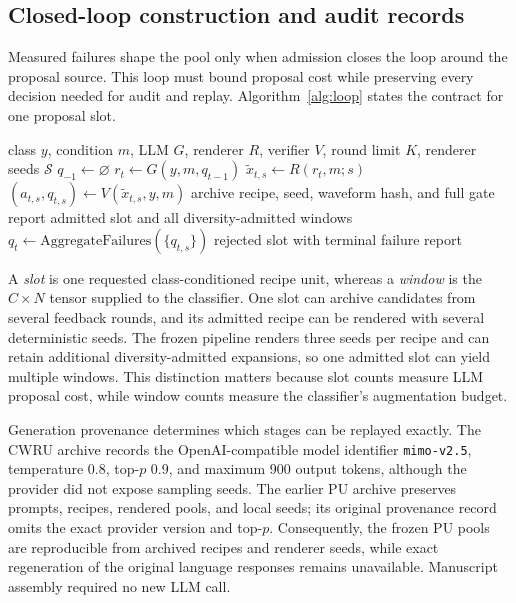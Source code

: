 \documentclass[a4paper,fleqn]{cas-sc}
\newcommand{\breeze}{BREEZE}
\begin{document}
\subsection{Closed-loop construction and audit records}

Measured failures shape the pool only when admission closes the loop around the
proposal source. This loop must bound proposal cost while preserving every
decision needed for audit and replay. Algorithm~\ref{alg:loop} states the
contract for one proposal slot.

\begin{algorithm}[t]
\caption{\breeze\ recipe admission for one proposal slot}
\label{alg:loop}
\begin{algorithmic}[1]
\Require class $y$, condition $m$, LLM $G$, renderer $R$, verifier $V$,
round limit $K$, renderer seeds $\mathcal{S}$
\State $q_{-1}\gets\varnothing$
  \State $r_t\gets G(y,m,q_{t-1})$
    \State $\tilde{x}_{t,s}\gets R(r_t,m;s)$
    \State $(a_{t,s},q_{t,s})\gets V(\tilde{x}_{t,s},y,m)$
      \State archive recipe, seed, waveform hash, and full gate report
      \State \Return admitted slot and all diversity-admitted windows
    \EndIf
  \EndFor
  \State $q_t\gets\mathrm{AggregateFailures}(\{q_{t,s}\})$
\EndFor
\State \Return rejected slot with terminal failure report
\end{algorithmic}
\end{algorithm}

A \emph{slot} is one requested class-conditioned recipe unit, whereas a
\emph{window} is the $C\times N$ tensor supplied to the classifier. One slot
can archive candidates from several feedback rounds, and its admitted recipe
can be rendered with several deterministic seeds. The frozen pipeline renders
three seeds per recipe and can retain additional diversity-admitted expansions,
so one admitted slot can yield multiple windows. This distinction matters
because slot counts measure LLM proposal cost, while window counts measure the
classifier's augmentation budget.

Generation provenance determines which stages can be replayed exactly. The
CWRU archive records the OpenAI-compatible model identifier
\texttt{mimo-v2.5}, temperature 0.8, top-$p$ 0.9, and maximum 900 output
tokens, although the provider did not expose sampling seeds. The earlier PU
archive preserves prompts, recipes, rendered pools, and local seeds; its
original provenance record omits the exact provider version and top-$p$.
Consequently, the frozen PU pools are reproducible from archived recipes and
renderer seeds, while exact regeneration of the original language responses
remains unavailable. Manuscript assembly required no new LLM call.
\end{document}
